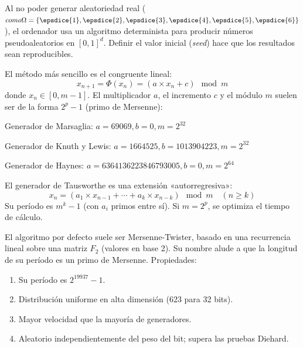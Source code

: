 \begin{f}
	Al no poder generar aleatoriedad real  (\(como \Omega=\{ \epsdice{1}, \epsdice{2}, \epsdice{3}, \epsdice{4}, \epsdice{5}, \epsdice{6} \}\)), el ordenador usa un algoritmo determinista para producir números pseudoaleatorios en \([0,1]^d\). Definir el valor inicial (\emph{seed}) hace que los resultados sean reproducibles.
	
	El método más sencillo es el congruente lineal:
	\[
	x_{n+1}=\Phi(x_n)= (a\times x_n+c) \mod m
	\] \small
	donde \(x_n \in [0, m-1]\). El multiplicador \(a\), el incremento \(c\) y el módulo \(m\) suelen ser de la forma \(2^p-1\) (primo de Mersenne):
	
	Generador de Marsaglia: \(a=69069, b=0, m=2^{32}\)
	
	Generador de Knuth y Lewis: \(a=1664525, b=1013904223, m=2^{32}\)
	
	Generador de Haynes: \(a=6364136223846793005, b=0, m=2^{64}\)
	
	El generador de Tausworthe es una extensión «autorregresiva»:
	\[
	x_{n}=(a_{1}\times x_{n-1}+\cdots +a_{k}\times x_{n-k}) \mod m \quad (n\geq k)
	\]
	Su período es \(m^k-1\) (con \(a_i\) primos entre sí). Si \(m=2^p\), se optimiza el tiempo de cálculo.
	
	El algoritmo por defecto suele ser Mersenne-Twister, basado en una recurrencia lineal sobre una matriz \(F_{2}\) (valores en base 2). Su nombre alude a que la longitud de su período es un primo de Mersenne. Propiedades:
	\begin{enumerate}
		\item Su período es \(2^{19937}-1 \).
		\item Distribución uniforme en alta dimensión (623 para 32 bits).
		\item Mayor velocidad que la mayoría de generadores.
		\item Aleatorio independientemente del peso del bit; supera las pruebas Diehard.
	\end{enumerate}
\end{f}
%

